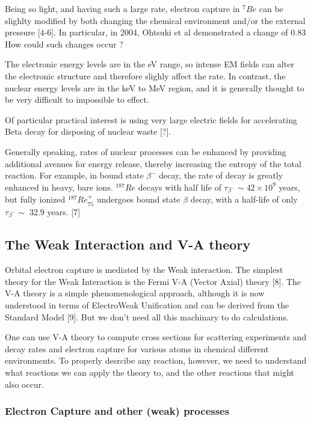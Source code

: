 \documentclass[11pt]{amsart}
\begin{document}
Being so light, and having such a large rate, electron capture in $^{7}Be$ can be slighlty modified by both changing the chemical environment and/or the external pressure [4-6]. In particular, in 2004, Ohtsuki et al demonstrated a change of 0.83%
How could such changes occur ?

The electronic energy levels are in the eV range, so intense EM fields can alter the electronic structure and therefore slighly affect the rate. In contrast, the nuclear energy levels are in the keV to MeV region, and it is generally thought to be very difficult to impossible to effect.

Of particular practical interest is using very large electric fields for accelerating Beta decay for disposing of nuclear waste [?].

Generally speaking, rates of nuclear processes can be enhanced by providing additional avenues for energy release, thereby increasing the entropy of the total reaction. For example, in bound state $ \beta^{-} $ decay, the rate of decay is greatly enhanced in heavy, bare ions.  $^{187}Re$ decays with half life of $\tau_{\beta^{-}}\sim 42\times 10^{9}$ years, but fully ionized $^{187}Re^{+}_{75}$ undergoes bound state $\beta$ decay, with a half-life of only $\tau_{\beta^{-}}\sim\;32.9$ years. [7]

\subsection{The Weak Interaction and V-A theory}

Orbital electron capture is mediated by the Weak interaction. The simplest theory for the Weak Interaction is the Fermi V-A (Vector Axial) theory [8].
The V-A theory is a simple phenomenological approach, although it is now understood in terms of ElectroWeak Unification and can be derived from the Standard Model [9]. But we don't need all this machinary to do calculations.

One can use V-A theory to compute cross sections for scattering experiments and decay rates and electron capture for various atoms in chemical different environments.
To properly desrcibe any reaction, however, we need to understand what reactions we can apply the theory to, and the other reactions that might also occur.

\subsubsection{Electron Capture and other (weak) processes} 
\end{document}
